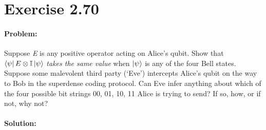 \section*{Exercise 2.70}
\paragraph{Problem:} Suppose \textit{E} is any positive operator acting on Alice's qubit. Show that $\bra{\psi} E \otimes \mathbb{I} \ket{\psi}$ \textit{takes the same value} when $\ket{\psi}$ is any of the four Bell states. Suppose some malevolent third party (`Eve') intercepts Alice's qubit on the way to Bob in the superdense coding protocol. Can Eve infer anything about which of the four possible bit strings 00, 01, 10, 11 Alice is trying to send? If so, how, or if not, why not? 

\paragraph{Solution:}